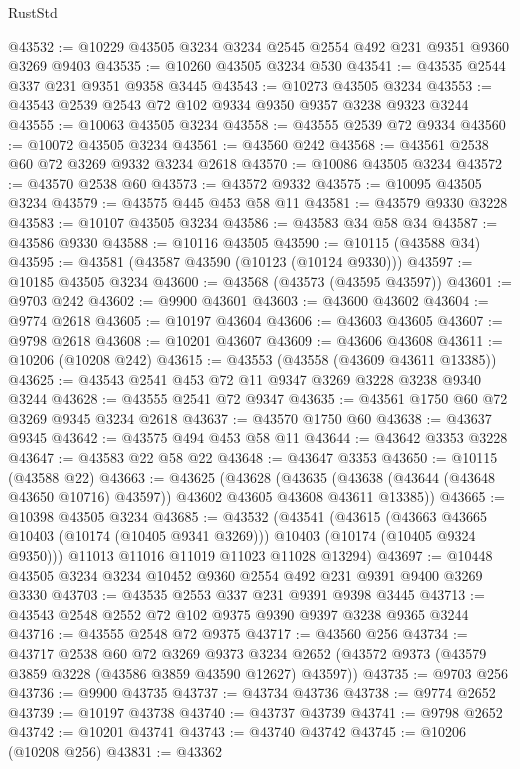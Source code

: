 \begin{lexlean}{RustStd}
\begin{coremodule}
@43532 := @10229 @43505 @3234 @3234 @2545 @2554 @492 @231 @9351 @9360 @3269 @9403
@43535 := @10260 @43505 @3234 @530
@43541 := @43535 @2544 @337 @231 @9351 @9358 @3445
@43543 := @10273 @43505 @3234
@43553 := @43543 @2539 @2543 @72 @102 @9334 @9350 @9357 @3238 @9323 @3244
@43555 := @10063 @43505 @3234
@43558 := @43555 @2539 @72 @9334
@43560 := @10072 @43505 @3234
@43561 := @43560 @242
@43568 := @43561 @2538 @60 @72 @3269 @9332 @3234 @2618
@43570 := @10086 @43505 @3234
@43572 := @43570 @2538 @60
@43573 := @43572 @9332
@43575 := @10095 @43505 @3234
@43579 := @43575 @445 @453 @58 @11
@43581 := @43579 @9330 @3228
@43583 := @10107 @43505 @3234
@43586 := @43583 @34 @58 @34
@43587 := @43586 @9330
@43588 := @10116 @43505
@43590 := @10115 (@43588 @34)
@43595 := @43581 (@43587 @43590 (@10123 (@10124 @9330)))
@43597 := @10185 @43505 @3234
@43600 := @43568 (@43573 (@43595 @43597))
@43601 := @9703 @242
@43602 := @9900 @43601
@43603 := @43600 @43602
@43604 := @9774 @2618
@43605 := @10197 @43604
@43606 := @43603 @43605
@43607 := @9798 @2618
@43608 := @10201 @43607
@43609 := @43606 @43608
@43611 := @10206 (@10208 @242)
@43615 := @43553 (@43558 (@43609 @43611 @13385))
@43625 := @43543 @2541 @453 @72 @11 @9347 @3269 @3228 @3238 @9340 @3244
@43628 := @43555 @2541 @72 @9347
@43635 := @43561 @1750 @60 @72 @3269 @9345 @3234 @2618
@43637 := @43570 @1750 @60
@43638 := @43637 @9345
@43642 := @43575 @494 @453 @58 @11
@43644 := @43642 @3353 @3228
@43647 := @43583 @22 @58 @22
@43648 := @43647 @3353
@43650 := @10115 (@43588 @22)
@43663 := @43625
    (@43628
      (@43635 (@43638 (@43644 (@43648 @43650 @10716) @43597)) @43602 @43605 @43608 @43611 @13385))
@43665 := @10398 @43505 @3234
@43685 := @43532
    (@43541
      (@43615
        (@43663 @43665 @10403 (@10174 (@10405 @9341 @3269)))
        @10403
        (@10174 (@10405 @9324 @9350)))
      @11013
      @11016
      @11019
      @11023
      @11028
      @13294)
@43697 := @10448 @43505 @3234 @3234 @10452 @9360 @2554 @492 @231 @9391 @9400 @3269 @3330
@43703 := @43535 @2553 @337 @231 @9391 @9398 @3445
@43713 := @43543 @2548 @2552 @72 @102 @9375 @9390 @9397 @3238 @9365 @3244
@43716 := @43555 @2548 @72 @9375
@43717 := @43560 @256
@43734 := @43717
    @2538
    @60
    @72
    @3269
    @9373
    @3234
    @2652
    (@43572 @9373 (@43579 @3859 @3228 (@43586 @3859 @43590 @12627) @43597))
@43735 := @9703 @256
@43736 := @9900 @43735
@43737 := @43734 @43736
@43738 := @9774 @2652
@43739 := @10197 @43738
@43740 := @43737 @43739
@43741 := @9798 @2652
@43742 := @10201 @43741
@43743 := @43740 @43742
@43745 := @10206 (@10208 @256)
@43831 := @43362

\end{coremodule}
\end{lexlean}
